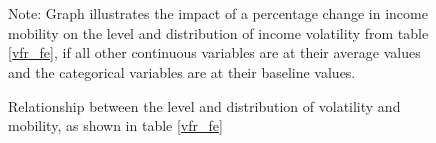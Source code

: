 \documentclass[12pt]{article}
\begin{document}
\begin{figure}[htp!]
    \captionsetup[subfigure]{position=b}
    \caption{Relationship between the level and distribution of volatility and mobility, as shown in table \ref{vfr_fe}}
    \hfill
    \label{margins_beta_lambda}
    \\\\
    \raggedright{\footnotesize{Note: Graph illustrates the impact of a percentage change in income mobility on the level and distribution of income volatility from table \ref{vfr_fe}, if all other continuous variables are at their average values and the categorical variables are at their baseline values.}}
\end{figure}
\end{document}
